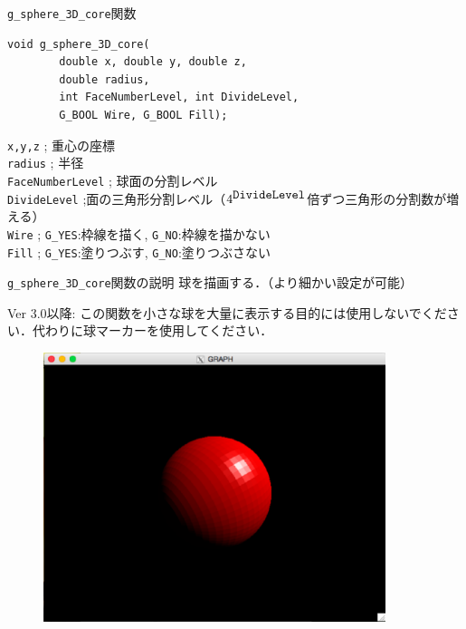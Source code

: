 \documentclass[platex,a4paper,12pt]{jsarticle}%
\begin{document}
\begin{itembox}[l]{\texttt{g\_sphere\_3D\_core}関数}
\begin{verbatim}
void g_sphere_3D_core(
        double x, double y, double z,
        double radius,
        int FaceNumberLevel, int DivideLevel, 
        G_BOOL Wire, G_BOOL Fill);   
\end{verbatim}
\verb|x,y,z| ; 重心の座標\\
\verb|radius| ; 半径\\
\verb|FaceNumberLevel| ; 球面の分割レベル\\
\verb|DivideLevel| ;面の三角形分割レベル（$4^{\verb|DivideLevel|}$倍ずつ三角形の分割数が増える）\\
\verb|Wire| ; \verb|G_YES|:枠線を描く, \verb|G_NO|:枠線を描かない \\
\verb|Fill| ; \verb|G_YES|:塗りつぶす, \verb|G_NO|:塗りつぶさない
\end{itembox}

\begin{itembox}[l]{\texttt{g\_sphere\_3D\_core}関数の説明}
球を描画する．（より細かい設定が可能）

Ver 3.0以降: この関数を小さな球を大量に表示する目的には使用しないでください．代わりに球マーカーを使用してください．
\end{itembox}

\begin{figure}[htb]
	\includegraphics[width=100mm]{./Figures/eps/Canvas_g_sphere.eps}
\end{figure}
\end{document}
